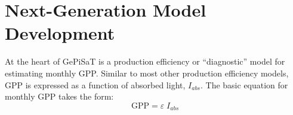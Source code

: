 %
%
%
%
%
\section{Next-Generation Model Development}
\label{sec:nxtgen}
At the heart of GePiSaT is a production efficiency or ``diagnostic'' model for estimating monthly GPP. 
Similar to most other production efficiency models, GPP is expressed as a function of absorbed light, $I_{abs}$.
The basic equation for monthly GPP takes the form:
\begin{equation}
\label{eq:pem}
    \text{GPP} = \varepsilon\; I_{abs} 
\end{equation}

